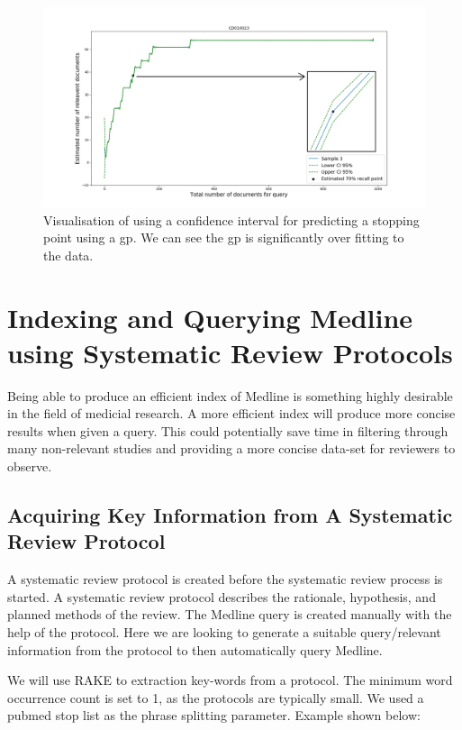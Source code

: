 \begin{figure}[H]
\center
\includegraphics[width=12cm]{figures/joined_graph.png}
\caption{Visualisation of using a confidence interval for predicting a stopping point using a gp. We can see the gp is significantly over fitting to the data.}
\end{figure}

\section{Indexing and Querying Medline using Systematic Review Protocols}

Being able to produce an efficient index of Medline is something highly desirable in the field of medicial research. A more efficient index will produce more concise results when given a query. This could potentially save time in filtering through many non-relevant studies and providing a more concise data-set for reviewers to observe. 

\subsection{Acquiring Key Information from A Systematic Review Protocol}

A systematic review protocol is created before the systematic review process is started. A systematic review protocol describes the rationale, hypothesis, and planned methods of the review. The Medline query is created manually with the help of the protocol. Here we are looking to generate a suitable query/relevant information from the protocol to then automatically query Medline.

We will use RAKE \cite{rake} to extraction key-words from a protocol. The minimum word occurrence count is set to 1, as the protocols are typically small. We used a pubmed stop list as the phrase splitting parameter. Example shown below:

